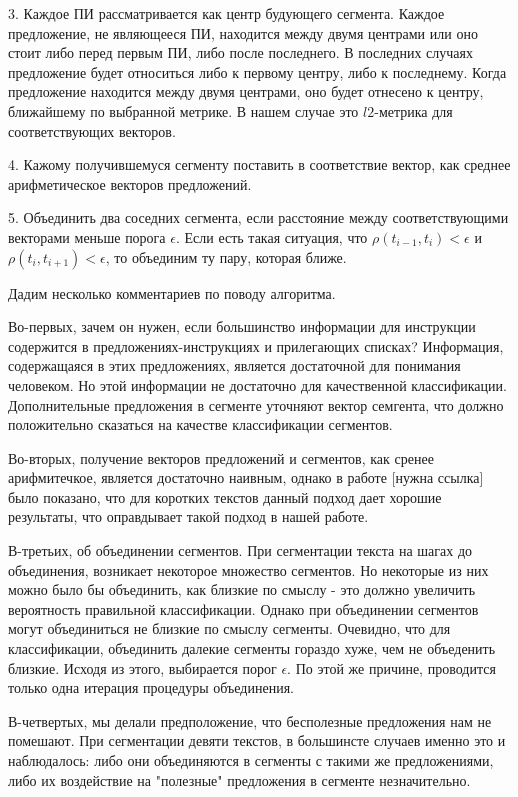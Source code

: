 \documentclass[12pt]{article}
\begin{document}
	3. Каждое ПИ рассматривается как центр будующего сегмента. Каждое предложение, не являющееся ПИ, находится между двумя центрами или оно стоит либо перед первым ПИ, либо после последнего. В последних случаях предложение будет относиться либо к первому центру, либо к последнему. Когда предложение находится между двумя центрами, оно будет отнесено к центру, ближайшему по выбранной метрике. В нашем случае это $l2$-метрика для соответствующих векторов.
	
	4. Кажому получившемуся сегменту поставить в соответствие вектор, как среднее арифметическое векторов предложений.
	
	5. Объединить два соседних сегмента, если расстояние между соответствующими векторами меньше порога $\epsilon$. Если есть такая ситуация, что $\rho(t_{i-1}, t_i)<\epsilon$ и $\rho(t_i, t_{i+1})<\epsilon$, то объединим ту пару, которая ближе.
	
Дадим несколько комментариев по поводу алгоритма.

Во-первых, зачем он нужен, если большинство информации для инструкции содержится в предложениях-инструкциях и прилегающих списках? Информация, содержащаяся в этих предложениях, является достаточной для понимания человеком. Но этой информации не достаточно для качественной классификации. Дополнительные предложения в сегменте уточняют вектор семгента, что должно положительно сказаться на качестве классификации сегментов.

Во-вторых, получение векторов предложений и сегментов, как сренее арифмитечкое, является достаточно наивным, однако в работе [нужна ссылка] было показано, что для коротких текстов данный подход дает хорошие результаты, что оправдывает такой подход в нашей работе.

В-третьих, об объединении сегментов. При сегментации текста на шагах до объединения, возникает некоторое множество сегментов. Но некоторые из них можно было бы объединить, как близкие по смыслу - это должно увеличить вероятность правильной классификации. Однако при объединении сегментов могут объединиться не близкие по смыслу сегменты. Очевидно, что для классификации, объединить далекие сегменты гораздо хуже, чем не объеденить близкие. Исходя из этого, выбирается порог $\epsilon$. По этой же причине, проводится только одна итерация процедуры объединения.

В-четвертых, мы делали предположение, что бесполезные предложения нам не помешают. При сегментации девяти текстов, в большинсте случаев именно это и наблюдалось: либо они объединяются в сегменты с такими же предложениями, либо их воздействие на "полезные" предложения в сегменте незначительно.
\end{document}
